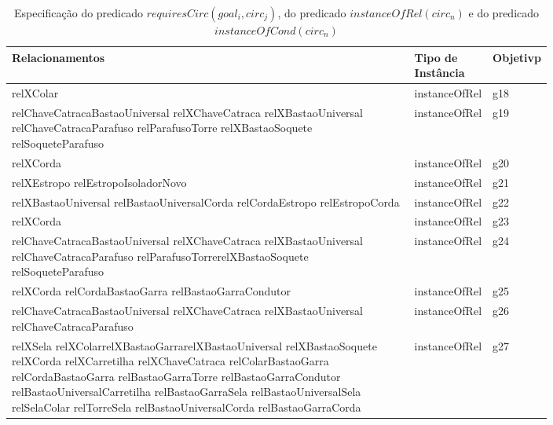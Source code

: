 \begin{table}[H]
\centering
{}
\begin{tabular}{|p{0.8\linewidth}|l|l|}
\hline
\textbf{Relacionamentos}																						& \textbf{Tipo de Instância}          			& \textbf{Objetivp} \\ \hline
relXColar                                                                                                       & instanceOfRel              		 			& g18        \\ \hline
relChaveCatracaBastaoUniversal relXChaveCatraca relXBastaoUniversal relChaveCatracaParafuso relParafusoTorre relXBastaoSoquete 
relSoqueteParafuso                                                                                              & instanceOfRel              		 			& g19        \\ \hline
relXCorda                                                                                                       & instanceOfRel              		 			& g20        \\ \hline
relXEstropo relEstropoIsoladorNovo                                                                              & instanceOfRel              		 			& g21        \\ \hline
relXBastaoUniversal relBastaoUniversalCorda relCordaEstropo relEstropoCorda                                     & instanceOfRel              		 			& g22        \\ \hline
relXCorda                                                                                                       & instanceOfRel              		 			& g23        \\ \hline
relChaveCatracaBastaoUniversal relXChaveCatraca relXBastaoUniversal relChaveCatracaParafuso 
relParafusoTorrerelXBastaoSoquete relSoqueteParafuso 															& instanceOfRel						 			& g24        \\ \hline
relXCorda relCordaBastaoGarra relBastaoGarraCondutor                                                            & instanceOfRel						 			& g25        \\ \hline
relChaveCatracaBastaoUniversal relXChaveCatraca relXBastaoUniversal relChaveCatracaParafuso                     & instanceOfRel						 			& g26        \\ \hline
relXSela relXColarrelXBastaoGarrarelXBastaoUniversal relXBastaoSoquete relXCorda relXCarretilha relXChaveCatraca relColarBastaoGarra relCordaBastaoGarra relBastaoGarraTorre relBastaoGarraCondutor relBastaoUniversalCarretilha relBastaoGarraSela relBastaoUniversalSela relSelaColar relTorreSela relBastaoUniversalCorda relBastaoGarraCorda 
																												& instanceOfRel						 			& g27  \\ \hline
\end{tabular}
\caption{Especificação do predicado $requiresCirc(goal_i,circ_j)$, do predicado $instanceOfRel(circ_n)$ e do predicado $instanceOfCond(circ_n)$}
\label{relationsgroup2}
\end{table}


